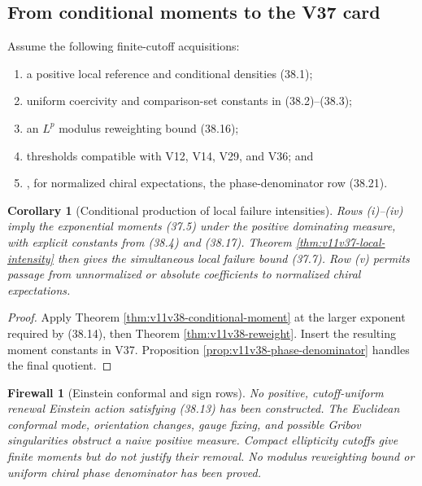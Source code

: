 \documentclass[11pt]{article}
\newtheorem{corollary}[theorem]{Corollary}
\newtheorem{firewall}[theorem]{Firewall}
\begin{document}
\subsection{From conditional moments to the V37 card}

Assume the following finite-cutoff acquisitions:
\begin{enumerate}[label=\textnormal{(\roman*)}]
\item a positive local reference and conditional densities (38.1);
\item uniform coercivity and comparison-set constants in
(38.2)--(38.3);
\item an \(L^p\) modulus reweighting bound (38.16);
\item thresholds compatible with V12, V14, V29, and V36; and
\item, for normalized chiral expectations, the phase-denominator row
(38.21).
\end{enumerate}

\begin{corollary}[Conditional production of local failure intensities]
\label{cor:v11v38-production}
Rows (i)--(iv) imply the exponential moments (37.5) under the positive
dominating measure, with explicit constants from (38.4) and (38.17).
Theorem \ref{thm:v11v37-local-intensity} then gives the simultaneous
local failure bound (37.7).  Row (v) permits passage from unnormalized
or absolute coefficients to normalized chiral expectations.
\end{corollary}

\begin{proof}
Apply Theorem \ref{thm:v11v38-conditional-moment} at the larger exponent
required by (38.14), then Theorem \ref{thm:v11v38-reweight}.  Insert the
resulting moment constants in V37.  Proposition
\ref{prop:v11v38-phase-denominator} handles the final quotient.
\end{proof}

\begin{firewall}[Einstein conformal and sign rows]
\label{fw:v11v38-einstein}
No positive, cutoff-uniform renewal Einstein action satisfying
(38.13) has been constructed.  The Euclidean conformal mode, orientation
changes, gauge fixing, and possible Gribov singularities obstruct a
naive positive measure.  Compact ellipticity cutoffs give finite
moments but do not justify their removal.  No modulus reweighting bound
or uniform chiral phase denominator has been proved.
\end{firewall}
\end{document}
